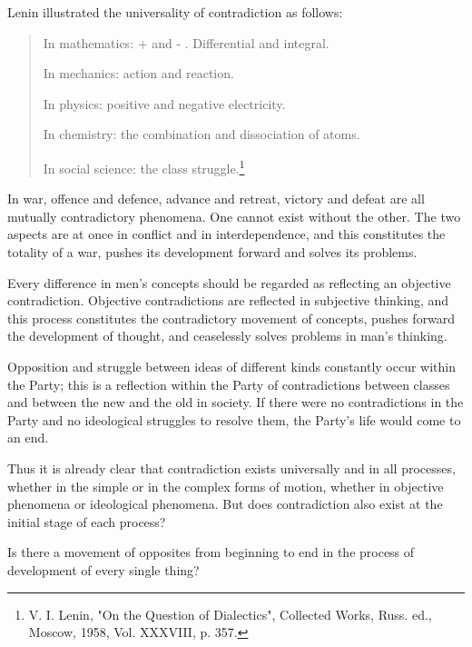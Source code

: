 \documentclass{article}
\begin{document}
Lenin illustrated the universality of contradiction as follows:

\begin{quote}
In mathematics: + and - . Differential and integral.

In mechanics: action and reaction.

In physics: positive and negative electricity.

In chemistry: the combination and dissociation of atoms.

In social science: the class struggle.\footnote{V. I. Lenin, "On the Question of Dialectics", Collected Works, Russ. ed., Moscow, 1958, Vol. XXXVIII, p. 357.}
\end{quote}

In war, offence and defence, advance and retreat, victory and defeat are all
mutually contradictory phenomena. One cannot exist without the other. The two
aspects are at once in conflict and in interdependence, and this constitutes
the totality of a war, pushes its development forward and solves its problems.

Every difference in men's concepts should be regarded as reflecting an
objective contradiction. Objective contradictions are reflected in subjective
thinking, and this process constitutes the contradictory movement of concepts,
pushes forward the development of thought, and ceaselessly solves problems in
man's thinking.

Opposition and struggle between ideas of different kinds constantly occur
within the Party; this is a reflection within the Party of contradictions
between classes and between the new and the old in society. If there were no
contradictions in the Party and no ideological struggles to resolve them, the
Party's life would come to an end.

Thus it is already clear that contradiction exists universally and in all
processes, whether in the simple or in the complex forms of motion, whether in
objective phenomena or ideological phenomena. But does contradiction also exist
at the initial stage of each process?

Is there a movement of opposites from beginning to end in the process of
development of every single thing?
\end{document}
